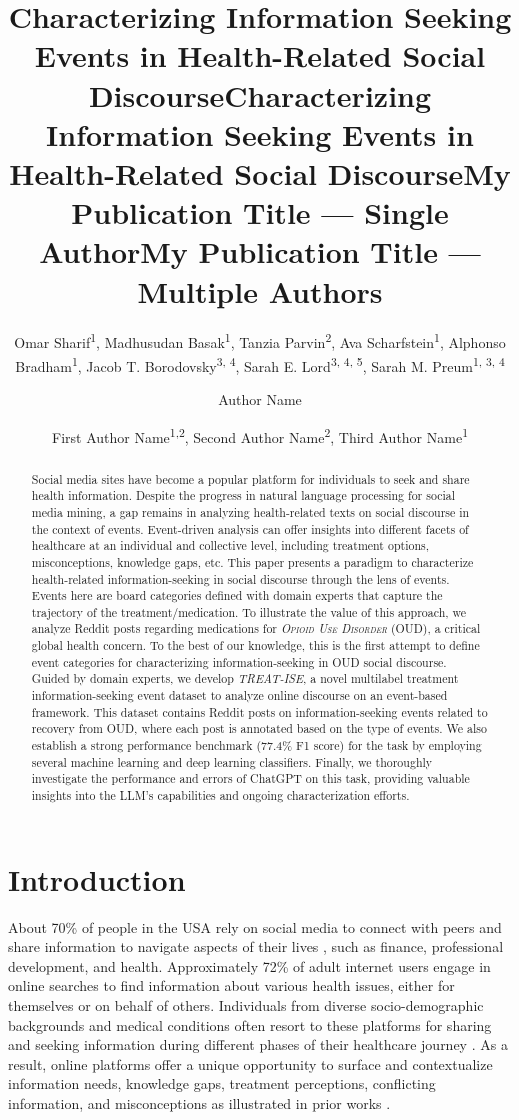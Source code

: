 \documentclass[letterpaper]{article}
\title{Characterizing Information Seeking Events in Health-Related Social Discourse}
\title{Characterizing Information Seeking Events in Health-Related Social Discourse}
\author {
Omar Sharif\textsuperscript{\rm 1},
Madhusudan Basak\textsuperscript{\rm1},
Tanzia Parvin\textsuperscript{\rm 2},
Ava Scharfstein\textsuperscript{\rm 1},
Alphonso Bradham\textsuperscript{\rm 1},
Jacob T. Borodovsky\textsuperscript{\rm 3, \rm 4},
Sarah E. Lord\textsuperscript{\rm 3, \rm 4, \rm 5},
Sarah M. Preum\textsuperscript{\rm 1, \rm 3, \rm 4}
}
\title{My Publication Title --- Single Author}
\author {
Author Name
}
\title{My Publication Title --- Multiple Authors}
\author {
First Author Name\textsuperscript{\rm 1,\rm 2},
Second Author Name\textsuperscript{\rm 2},
Third Author Name\textsuperscript{\rm 1}
}
\begin{document}
\maketitle

\begin{abstract}
Social media sites have become a popular platform for individuals to seek and share health information. Despite the progress in natural language processing for social media mining, a gap remains in analyzing health-related texts on social discourse in the context of events. Event-driven analysis can offer insights into different facets of healthcare at an individual and collective level, including treatment options, misconceptions, knowledge gaps, etc. This paper presents a paradigm to characterize health-related information-seeking in social discourse through the lens of events. Events here are board categories defined with domain experts that capture the trajectory of the treatment/medication. To illustrate the value of this approach, we analyze Reddit posts regarding medications for \textit{\textsc{Opioid Use Disorder}} (OUD), a critical global health concern. To the best of our knowledge, this is the first attempt to define event categories for characterizing information-seeking in OUD social discourse. Guided by domain experts, we develop \textit{TREAT-ISE}, a novel multilabel treatment information-seeking event dataset to analyze online discourse on an event-based framework. This dataset contains Reddit posts on information-seeking events related to recovery from OUD, where each post is annotated based on the type of events. We also establish a strong performance benchmark (77.4\% F1 score) for the task by employing several machine learning and deep learning classifiers. Finally, we thoroughly investigate the performance and errors of ChatGPT on this task, providing valuable insights into the LLM's capabilities and ongoing characterization efforts.
\end{abstract}

\section{Introduction}

About 70\% of people in the USA rely on social media to connect with peers and share information to navigate aspects of their lives \cite{kanchan2023social}, such as finance, professional development, and health. Approximately 72\% of adult internet users engage in online searches to find information about various health issues, either for themselves or on behalf of others. Individuals from diverse socio-demographic backgrounds and medical conditions often resort to these platforms for sharing and seeking information during different phases of their healthcare journey \cite{Neely2021-ji}. As a result, online platforms offer a unique opportunity to surface and contextualize information needs, knowledge gaps, treatment perceptions, conflicting information, and misconceptions as illustrated in prior works \cite{EDOOSAGIE2020103770,chen2021social,gatto2023scope, acm_review}.
\end{document}
